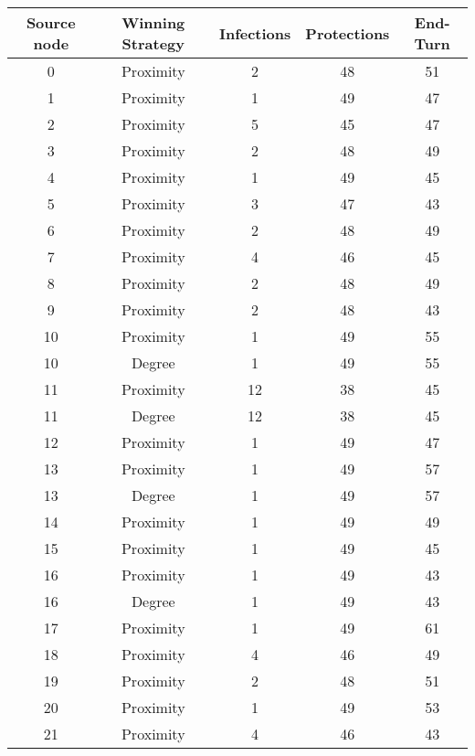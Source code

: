 \documentclass[results.tex]{subfiles}
\begin{document}
\begin{center}
  \begin{tabular}{| c || c | c | c | c |}
    \hline
    {\bfseries Source node} & {\bfseries Winning Strategy} & {\bfseries Infections} & {\bfseries Protections} & {\bfseries End-Turn} \\  %
    \hline\hline
    0 & Proximity & 2 & 48 & 51 \\ 
    \hline
    1 & Proximity & 1 & 49 & 47 \\ 
    \hline
    2 & Proximity & 5 & 45 & 47 \\ 
    \hline
    3 & Proximity & 2 & 48 & 49 \\ 
    \hline
    4 & Proximity & 1 & 49 & 45 \\ 
    \hline
    5 & Proximity & 3 & 47 & 43 \\ 
    \hline
    6 & Proximity & 2 & 48 & 49 \\ 
    \hline
    7 & Proximity & 4 & 46 & 45 \\ 
    \hline
    8 & Proximity & 2 & 48 & 49 \\ 
    \hline
    9 & Proximity & 2 & 48 & 43 \\ 
    \hline
    10 & Proximity & 1 & 49 & 55 \\ 
    \hline
    10 & Degree & 1 & 49 & 55 \\ 
    \hline
    11 & Proximity & 12 & 38 & 45 \\ 
    \hline
    11 & Degree & 12 & 38 & 45 \\ 
    \hline
    12 & Proximity & 1 & 49 & 47 \\ 
    \hline
    13 & Proximity & 1 & 49 & 57 \\ 
    \hline
    13 & Degree & 1 & 49 & 57 \\ 
    \hline
    14 & Proximity & 1 & 49 & 49 \\ 
    \hline
    15 & Proximity & 1 & 49 & 45 \\ 
    \hline
    16 & Proximity & 1 & 49 & 43 \\ 
    \hline
    16 & Degree & 1 & 49 & 43 \\ 
    \hline
    17 & Proximity & 1 & 49 & 61 \\ 
    \hline
    18 & Proximity & 4 & 46 & 49 \\ 
    \hline
    19 & Proximity & 2 & 48 & 51 \\ 
    \hline
    20 & Proximity & 1 & 49 & 53 \\ 
    \hline
    21 & Proximity & 4 & 46 & 43 \\ 

\end{tabular}
\end{center}
\end{document}
